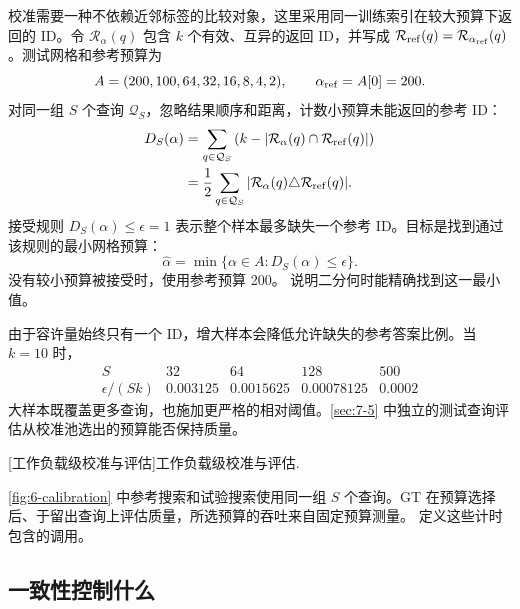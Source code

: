 校准需要一种不依赖近邻标签的比较对象，这里采用同一训练索引在较大预算下返回的 ID。令 $\mathcal R_\alpha(q)$ 包含 $k$ 个有效、互异的返回 ID，并写成 $\mathcal R_{\rm ref}(q)=\mathcal R_{\alpha_{\rm ref}}(q)$。测试网格和参考预算为
\begin{equation}
 A=(200,100,64,32,16,8,4,2),\qquad \alpha_{\rm ref}=A[0]=200.
 \label{eq:6-grid}
\end{equation}
对同一组 $S$ 个查询 $\mathcal Q_S$，忽略结果顺序和距离，计数小预算未能返回的参考 ID：
\begin{equation}
 \begin{aligned}
 D_S(\alpha)
 &=\sum_{q\in\mathcal Q_S}
   \left(k-|\mathcal R_\alpha(q)\cap\mathcal R_{\rm ref}(q)|\right)\\
 &=\frac12\sum_{q\in\mathcal Q_S}
   |\mathcal R_\alpha(q)\triangle\mathcal R_{\rm ref}(q)|.
 \end{aligned}
 \label{eq:6-agreement}
\end{equation}
接受规则 $D_S(\alpha)\leq\epsilon=1$ 表示整个样本最多缺失一个参考 ID。目标是找到通过该规则的最小网格预算：
\begin{equation}
 \widehat\alpha=\min\{\alpha\in A:D_S(\alpha)\leq\epsilon\}.
 \label{eq:6-selection-objective}
\end{equation}
没有较小预算被接受时，使用参考预算 200。 说明二分何时能精确找到这一最小值。

由于容许量始终只有一个 ID，增大样本会降低允许缺失的参考答案比例。当 $k=10$ 时，
\[
 \begin{array}{c|rrrr}S&32&64&128&500\\\hline
 \epsilon/(Sk)&0.003125&0.0015625&0.00078125&0.0002
 \end{array}
\]
大样本既覆盖更多查询，也施加更严格的相对阈值。\cref{sec:7-5} 中独立的测试查询评估从校准池选出的预算能否保持质量。

\par\medskip\noindent\begin{minipage}{\linewidth}
\captionsetup{hypcap=false}
\centering

[工作负载级校准与评估]{工作负载级校准与评估.}
\label{fig:6-calibration}
\end{minipage}\par\medskip
\cref{fig:6-calibration} 中参考搜索和试验搜索使用同一组 $S$ 个查询。GT 在预算选择后、于留出查询上评估质量，所选预算的吞吐来自固定预算测量。 定义这些计时包含的调用。

\subsection{一致性控制什么}

